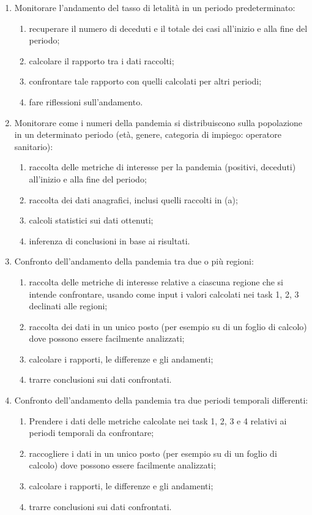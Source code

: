 \begin{enumerate}[resume]
    \item Monitorare l'andamento del tasso di letalità in un periodo predeterminato:
    \begin{enumerate}[label=\alph*.]
        \item recuperare il numero di deceduti e il totale dei casi all'inizio e alla fine del periodo;
        \item calcolare il rapporto tra i dati raccolti;
        \item confrontare tale rapporto con quelli calcolati per altri periodi;
        \item fare riflessioni sull'andamento.
    \end{enumerate}
    \item Monitorare come i numeri della pandemia si distribuiscono sulla popolazione in un determinato periodo (età, genere, categoria di impiego: operatore sanitario):
    \begin{enumerate}[label=\alph*.]
        \item raccolta delle metriche di interesse per la pandemia (positivi, deceduti) all'inizio e alla fine del periodo;
        \item raccolta dei dati anagrafici, inclusi quelli raccolti in (a);
        \item calcoli statistici sui dati ottenuti;
        \item inferenza di conclusioni in base ai risultati.
    \end{enumerate}
    \item Confronto dell'andamento della pandemia tra due o più regioni:
    \begin{enumerate}[label=\alph*.]
        \item raccolta delle metriche di interesse relative a ciascuna regione che si intende confrontare, usando come input i valori calcolati nei task 1, 2, 3 declinati alle regioni;
        \item raccolta dei dati in un unico posto (per esempio su di un foglio di calcolo) dove possono essere facilmente analizzati;
        \item calcolare i rapporti, le differenze e gli andamenti;
        \item trarre conclusioni sui dati confrontati.
    \end{enumerate}
    \item Confronto dell'andamento della pandemia tra due periodi temporali differenti:
    \begin{enumerate}[label=\alph*.]
        \item Prendere i dati delle metriche calcolate nei task 1, 2, 3 e 4 relativi ai periodi temporali da confrontare;
        \item raccogliere i dati in un unico posto (per esempio su di un foglio di calcolo) dove possono essere facilmente analizzati;
        \item calcolare i rapporti, le differenze e gli andamenti;
        \item trarre conclusioni sui dati confrontati.
    \end{enumerate}
\end{enumerate}